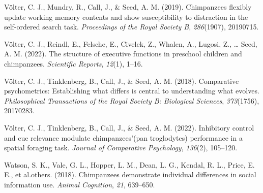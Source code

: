 \documentclass[
  man,floatsintext]{apa6}
\newlength{\cslhangindent}
\newenvironment{CSLReferences}[2] %
 {\begin{list}{}{%
  \setlength{\itemindent}{0pt}
  \setlength{\leftmargin}{0pt}
  \setlength{\parsep}{0pt}
  \ifodd #1
   \setlength{\leftmargin}{\cslhangindent}
   \setlength{\itemindent}{-1\cslhangindent}
  \fi
  \setlength{\itemsep}{#2\baselineskip}}}
 {\end{list}}
\begin{document}
\begin{CSLReferences}{1}{0}
Völter, C. J., Mundry, R., Call, J., \& Seed, A. M. (2019). Chimpanzees flexibly update working memory contents and show susceptibility to distraction in the self-ordered search task. \emph{Proceedings of the Royal Society B}, \emph{286}(1907), 20190715.

Völter, C. J., Reindl, E., Felsche, E., Civelek, Z., Whalen, A., Lugosi, Z., \ldots{} Seed, A. M. (2022). The structure of executive functions in preschool children and chimpanzees. \emph{Scientific Reports}, \emph{12}(1), 1--16.

Völter, C. J., Tinklenberg, B., Call, J., \& Seed, A. M. (2018). Comparative psychometrics: Establishing what differs is central to understanding what evolves. \emph{Philosophical Transactions of the Royal Society B: Biological Sciences}, \emph{373}(1756), 20170283.

Völter, C. J., Tinklenberg, B., Call, J., \& Seed, A. M. (2022). Inhibitory control and cue relevance modulate chimpanzees'(pan troglodytes) performance in a spatial foraging task. \emph{Journal of Comparative Psychology}, \emph{136}(2), 105--120.

Watson, S. K., Vale, G. L., Hopper, L. M., Dean, L. G., Kendal, R. L., Price, E. E., et al.others. (2018). Chimpanzees demonstrate individual differences in social information use. \emph{Animal Cognition}, \emph{21}, 639--650.

\end{CSLReferences}
\end{document}
